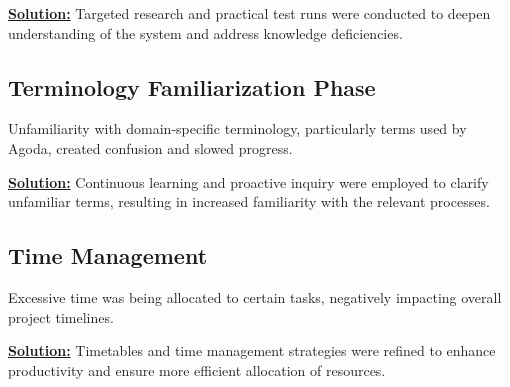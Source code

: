 \underline{\textbf{Solution:}} Targeted research and practical test runs were conducted to deepen understanding of the system and address knowledge deficiencies.

\subsection{Terminology Familiarization Phase} Unfamiliarity with domain-specific terminology, particularly terms used by Agoda, created confusion and slowed progress. 

\underline{\textbf{Solution:}} Continuous learning and proactive inquiry were employed to clarify unfamiliar terms, resulting in increased familiarity with the relevant processes.

\subsection{Time Management} Excessive time was being allocated to certain tasks, negatively impacting overall project timelines. 

\underline{\textbf{Solution:}} Timetables and time management strategies were refined to enhance productivity and ensure more efficient allocation of resources.  
    
    

